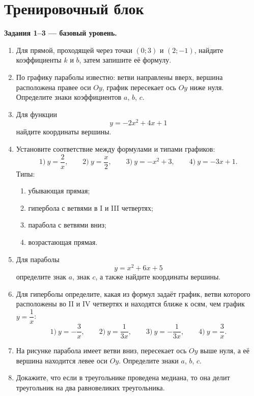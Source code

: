 \documentclass[a4paper,12pt]{article}
\begin{document}
\newpage

\section*{Тренировочный блок}

\textbf{Задания 1--3 --- базовый уровень.}

\begin{enumerate}
  \item Для прямой, проходящей через точки \((0;3)\) и \((2;-1)\), найдите коэффициенты \(k\) и \(b\), затем запишите её формулу.

  \item По графику параболы известно: ветви направлены вверх, вершина расположена правее оси \(Oy\), график пересекает ось \(Oy\) ниже нуля. Определите знаки коэффициентов \(a\), \(b\), \(c\).

  \item Для функции
  \[
  y=-2x^2+4x+1
  \]
  найдите координаты вершины.

  \item Установите соответствие между формулами и типами графиков:
  \[
  1)\ y=\frac{2}{x},\qquad
  2)\ y=\frac{x}{2},\qquad
  3)\ y=-x^2+3,\qquad
  4)\ y=-3x+1.
  \]
  Типы:
  \begin{enumerate}
    \item убывающая прямая;
    \item гипербола с ветвями в I и III четвертях;
    \item парабола с ветвями вниз;
    \item возрастающая прямая.
  \end{enumerate}

  \item Для параболы
  \[
  y=x^2+6x+5
  \]
  определите знак \(a\), знак \(c\), а также найдите координаты вершины.

  \item Для гиперболы определите, какая из формул задаёт график, ветви которого расположены во II и IV четвертях и находятся ближе к осям, чем график \(y=\dfrac1x\):
  \[
  1)\ y=-\frac{3}{x},\qquad
  2)\ y=\frac{1}{3x},\qquad
  3)\ y=-\frac{1}{3x},\qquad
  4)\ y=\frac{3}{x}.
  \]

  \item На рисунке парабола имеет ветви вниз, пересекает ось \(Oy\) выше нуля, а её вершина находится левее оси \(Oy\). Определите знаки \(a\), \(b\), \(c\).

  \item Докажите, что если в треугольнике проведена медиана, то она делит треугольник на два равновеликих треугольника.


\end{enumerate}
\end{document}

